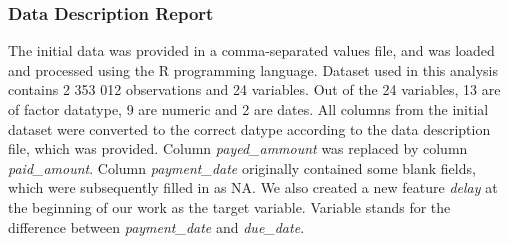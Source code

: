 \documentclass[
]{article}
\begin{document}
\hypertarget{data-description-report}{%
\subsubsection{Data Description Report}\label{data-description-report}}

The initial data was provided in a comma-separated values file, and was loaded and processed using the R programming language. Dataset used in this analysis contains 2 353 012 observations and 24 variables. Out of the 24 variables, 13 are of factor datatype, 9 are numeric and 2 are dates. All columns from the initial dataset were converted to the correct datype according to the data description file, which was provided. Column \emph{payed\_ammount} was replaced by column \emph{paid\_amount}. Column \emph{payment\_date} originally contained some blank fields, which were subsequently filled in as NA.
We also created a new feature \emph{delay} at the beginning of our work as the target variable. Variable stands for the difference between \emph{payment\_date} and \emph{due\_date}.
\end{document}
